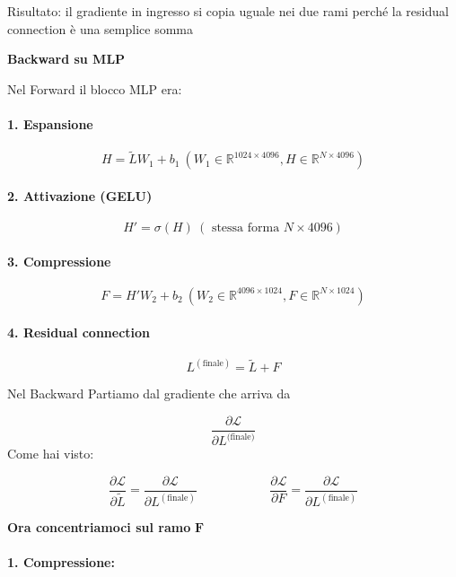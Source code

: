 \documentclass[
  11pt,
]{article}
\begin{document}
Risultato: il gradiente in ingresso si copia uguale nei due rami perché
la residual connection è una semplice somma

\textbf{Backward su MLP}

Nel Forward il blocco MLP era:

\paragraph{1. \textbf{Espansione}}

\[H = \widetilde{L}W_{1} + b_{1}\ \left( W_{1} \in \mathbb{R}^{1024 \times 4096},H \in \mathbb{R}^{N \times 4096} \right)\]

\paragraph{2. \textbf{Attivazione (GELU)}}

\[H' = \sigma(H)\ (\text{ stessa forma } N \times 4096)\]

\paragraph{3. \textbf{Compressione}}

\[F = H'W_{2} + b_{2}\ \left( W_{2} \in \mathbb{R}^{4096 \times 1024},F \in \mathbb{R}^{N \times 1024} \right)\]

\paragraph{4. \textbf{Residual connection}}

\[L^{(\text{finale})} = \widetilde{L} + F\]

Nel Backward Partiamo dal gradiente che arriva da

\[\frac{\partial\mathcal{L}}{\partial L^{\text{(finale)}}}
\]Come hai visto:

\[\frac{\partial\mathcal{L}}{\partial\widetilde{L}} = \frac{\partial\mathcal{L}}{\partial L^{(\text{finale})}}\ \ \ \ \ \ \ \ \ \ \ \ \ \ \ \ \ \ \ \ \ \ \ \ \ \ \frac{\partial\mathcal{L}}{\partial F} = \frac{\partial\mathcal{L}}{\partial L^{(\text{finale})}}\]

\textbf{Ora concentriamoci sul ramo} \(\mathbf{F}\)

\paragraph{1. \textbf{Compressione:}}
\end{document}
